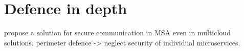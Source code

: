 

\section{Defence in depth}
\begin{sloppypar}
    \citet{defdepau} propose a solution for secure communication in MSA even in multicloud solutions.
    perimeter defence -> neglect security of individual microservices.
    



\end{sloppypar}
\begin{sloppypar}
\end{sloppypar}
\begin{sloppypar}
\end{sloppypar}



